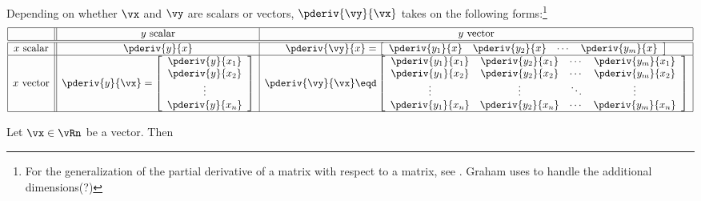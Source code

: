 \begin{remark}
Depending on whether $\vx$ and $\vy$ are scalars or vectors, 
$\pderiv{\vy}{\vx}$ takes on the following 
forms:\footnote{%
  For the generalization of the partial derivative of a matrix
  with respect to a matrix, see
  .
  Graham uses  to handle the additional dimensions(?)
  }
\[
\begin{array}{|c||c|c|}
   \hline
         & \text{$y$ scalar} & \text{$y$ vector} 
   \\
   \hline
   \hline
   \text{$x$ scalar}
   &
   \pderiv{y}{x}
   &
   \pderiv{\vy}{x} = 
   \left[\begin{array}{*{4}{c}}
         \pderiv{y_1}{x} & \pderiv{y_2}{x} & \cdots & \pderiv{y_m}{x} 
      \end{array}\right]
   \\ \hline
   \text{$x$ vector}
   &
   \pderiv{y}{\vx }= 
   \left[\begin{array}{c}
         \pderiv{y}{x_1} \\
         \pderiv{y}{x_2} \\
         \vdots          \\
         \pderiv{y}{x_n}
      \end{array}\right]
   &
   \pderiv{\vy}{\vx} \eqd
   \left[\begin{array}{ccccc}
         \pderiv{y_1}{x_1} & \pderiv{y_2}{x_1} & \cdots & \pderiv{y_m}{x_1} \\
         \pderiv{y_1}{x_2} & \pderiv{y_2}{x_2} & \cdots & \pderiv{y_m}{x_2} \\
         \vdots            & \vdots            & \ddots & \vdots            \\
         \pderiv{y_1}{x_n} & \pderiv{y_2}{x_n} & \cdots & \pderiv{y_m}{x_n}
      \end{array}\right]
   \\
   \hline
  \end{array}
\]
\end{remark}


\begin{lemma}
\label{lem:mc_pxx}
Let $\vx\in\vRn$ be a vector. Then
\end{lemma}

